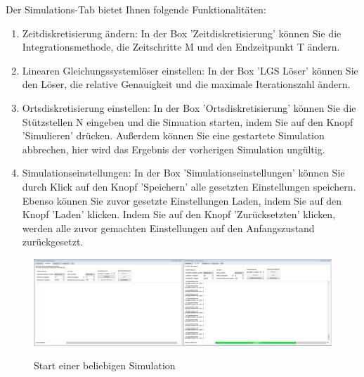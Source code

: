 \newpage
\noindent
Der Simulations-Tab bietet Ihnen folgende Funktionalitäten:\\
\begin{enumerate}
\item Zeitdiskretisierung ändern:
In der Box 'Zeitdiskretisierung' können Sie die Integrationsmethode, die Zeitschritte M und den Endzeitpunkt T ändern.
\item Linearen Gleichungssystemlöser einstellen:
In der Box 'LGS Löser' können Sie den Löser, die relative Genauigkeit und die maximale Iterationszahl ändern.
\item Ortsdiskretisierung einstellen:
In der Box 'Ortsdiskretisierung' können Sie die Stützstellen N eingeben und die Simuation starten, indem Sie auf den Knopf 'Simulieren' drücken. Außerdem können Sie eine gestartete Simulation abbrechen, hier wird das Ergebnis der vorherigen Simulation ungültig.
\item Simulationseinstellungen:
In der Box 'Simulationseinstellungen' können Sie durch Klick auf den Knopf 'Speichern' alle gesetzten Einstellungen speichern. Ebenso können Sie zuvor gesetzte Einstellungen Laden, indem Sie auf den Knopf 'Laden' klicken. Indem Sie auf den Knopf 'Zurücksetzten' klicken, werden alle zuvor gemachten Einstellungen auf den Anfangszustand zurückgesetzt.
\end{enumerate}
\begin{figure}[H]
\centering
\includegraphics[scale=.25]{Bilder/SimulationStarten.png}\\
\caption{Start einer beliebigen Simulation}
\label{SimulationStarten}
\end{figure}


